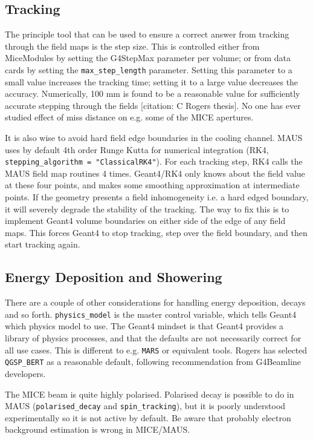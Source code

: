 \subsection{Tracking}
The principle tool that can be used to ensure a correct answer from tracking through the field maps is the step size. This is controlled either from MiceModules by setting the G4StepMax parameter per volume; or from
data cards by setting the \verb|max_step_length| parameter. Setting this parameter to a small value increases the tracking time; setting it to a large value decreases the accuracy. Numerically, 100 mm is found to be a reasonable value for sufficiently accurate stepping through the fields [citation: C Rogers thesis]. No one has ever studied effect of miss distance on e.g. some of the MICE apertures.

It is also wise to avoid hard field edge boundaries in the cooling channel. MAUS uses by default 4th order Runge Kutta for numerical integration (RK4, \verb|stepping_algorithm = "ClassicalRK4"|). For each tracking step, RK4 calls the MAUS field map routines 4 times. Geant4/RK4 only knows about the field value at these four points, and makes some smoothing approximation at intermediate points. If the geometry presents a field inhomogeneity i.e. a hard edged boundary, it will severely degrade the stability of the tracking. The way to fix this is to implement Geant4 volume boundaries on either side of the edge of any field maps. This forces Geant4 to stop tracking, step over the field boundary, and then start tracking again.

\subsection{Energy Deposition and Showering}
There are a couple of other considerations for handling energy deposition, decays and so forth. \verb|physics_model| is the master control variable, which tells Geant4 which physics model to use. The Geant4 mindset is that Geant4 provides a library of physics processes, and that the defaults are not necessarily correct for all use cases. This is different to e.g. \verb|MARS| or equivalent tools. Rogers has selected \verb|QGSP_BERT| as a reasonable default, following recommendation from G4Beamline developers.

The MICE beam is quite highly polarised. Polarised decay is possible to do in MAUS (\verb|polarised_decay| and \verb|spin_tracking|), but it is poorly understood experimentally so it is not active by default. Be aware that probably electron background estimation is wrong in MICE/MAUS.

